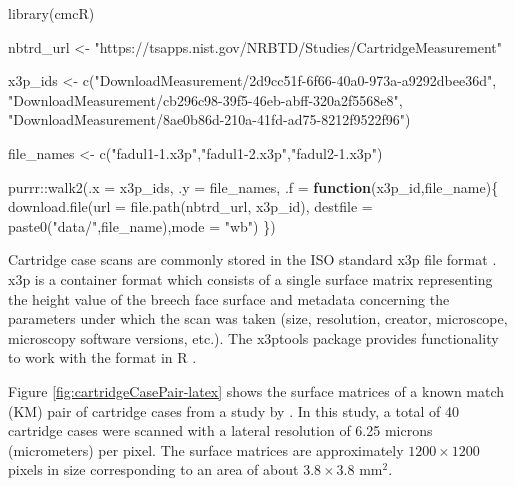 \documentclass[11pt,]{isuthesis}
\newenvironment{Shaded}{\begin{snugshade}}{\end{snugshade}}
\newcommand{\AttributeTok}[1]{\textcolor[rgb]{0.77,0.63,0.00}{#1}}
\newcommand{\ControlFlowTok}[1]{\textcolor[rgb]{0.13,0.29,0.53}{\textbf{#1}}}
\newcommand{\FunctionTok}[1]{\textcolor[rgb]{0.00,0.00,0.00}{#1}}
\newcommand{\NormalTok}[1]{#1}
\newcommand{\OtherTok}[1]{\textcolor[rgb]{0.56,0.35,0.01}{#1}}
\newcommand{\SpecialCharTok}[1]{\textcolor[rgb]{0.00,0.00,0.00}{#1}}
\newcommand{\StringTok}[1]{\textcolor[rgb]{0.31,0.60,0.02}{#1}}
\begin{document}
\begin{Shaded}
\begin{Highlighting}[]
\FunctionTok{library}\NormalTok{(cmcR)}

\NormalTok{nbtrd\_url }\OtherTok{\textless{}{-}} \StringTok{"https://tsapps.nist.gov/NRBTD/Studies/CartridgeMeasurement"}

\NormalTok{x3p\_ids }\OtherTok{\textless{}{-}} \FunctionTok{c}\NormalTok{(}\StringTok{"DownloadMeasurement/2d9cc51f{-}6f66{-}40a0{-}973a{-}a9292dbee36d"}\NormalTok{,}
             \StringTok{"DownloadMeasurement/cb296c98{-}39f5{-}46eb{-}abff{-}320a2f5568e8"}\NormalTok{,}
             \StringTok{"DownloadMeasurement/8ae0b86d{-}210a{-}41fd{-}ad75{-}8212f9522f96"}\NormalTok{)}

\NormalTok{file\_names }\OtherTok{\textless{}{-}} \FunctionTok{c}\NormalTok{(}\StringTok{"fadul1{-}1.x3p"}\NormalTok{,}\StringTok{"fadul1{-}2.x3p"}\NormalTok{,}\StringTok{"fadul2{-}1.x3p"}\NormalTok{)}

\NormalTok{purrr}\SpecialCharTok{::}\FunctionTok{walk2}\NormalTok{(}\AttributeTok{.x =}\NormalTok{ x3p\_ids,}
             \AttributeTok{.y =}\NormalTok{ file\_names,}
             \AttributeTok{.f =} \ControlFlowTok{function}\NormalTok{(x3p\_id,file\_name)\{}
               \FunctionTok{download.file}\NormalTok{(}\AttributeTok{url =} \FunctionTok{file.path}\NormalTok{(nbtrd\_url, x3p\_id),}
                             \AttributeTok{destfile =} \FunctionTok{paste0}\NormalTok{(}\StringTok{"data/"}\NormalTok{,file\_name),}\AttributeTok{mode =} \StringTok{"wb"}\NormalTok{)}
\NormalTok{             \})}
\end{Highlighting}
\end{Shaded}

Cartridge case scans are commonly stored in the ISO standard x3p file format \citep{ISO25178-72}.
x3p is a container format which consists of a single surface matrix representing the height value of the breech face surface and metadata concerning the parameters under which the scan was taken (size, resolution, creator, microscope, microscopy software versions, etc.).
The x3ptools package provides functionality to work with the format in R \citep{x3ptools}.

Figure \ref{fig:cartridgeCasePair-latex} shows the surface matrices of a known match (KM) pair of cartridge cases from a study by \citet{fadul_empirical_2011}.
In this study, a total of 40 cartridge cases were scanned with a lateral resolution of 6.25 microns (micrometers) per pixel.
The surface matrices are approximately \(1200 \times 1200\) pixels in size corresponding to an area of about \(3.8 \times 3.8\) mm\(^2\).
\end{document}
